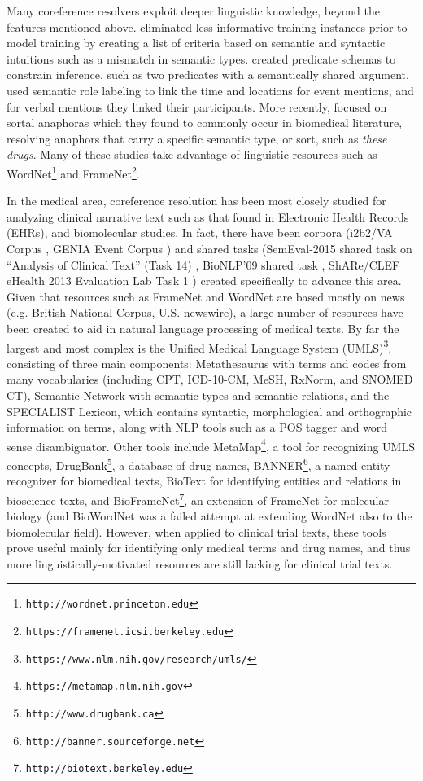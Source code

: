 Many coreference resolvers exploit deeper linguistic knowledge, beyond the features mentioned above.  eliminated less-informative training instances prior to model training by creating a list of criteria based on semantic and syntactic intuitions such as a mismatch in semantic types.  created predicate schemas to constrain inference, such as two predicates with a semantically shared argument.  used semantic role labeling to link the time and locations for event mentions, and for verbal mentions they linked their participants. More recently,  focused on sortal anaphoras which they found to commonly occur in biomedical literature, resolving anaphors that carry a specific semantic type, or sort, such as \textit{these drugs}.  Many of these studies take advantage of linguistic resources such as WordNet\footnote{\tt http://wordnet.princeton.edu} and FrameNet\footnote{\tt https://framenet.icsi.berkeley.edu}.

In the medical area, coreference resolution has been most closely studied for analyzing clinical narrative text such as that found in Electronic Health Records (EHRs), and biomolecular studies. In fact, there have been corpora (i2b2/VA Corpus \cite{Uzuner:2012}, GENIA Event Corpus \cite{Kim:2008}) and shared tasks (SemEval-2015 shared task on “Analysis of Clinical Text” (Task 14) \cite{Elhadad:2015}, BioNLP’09 shared task \cite{Kim:2009}, ShARe/CLEF eHealth 2013 Evaluation Lab Task 1 \cite{Pradhan:2013}) created specifically to advance this area. Given that resources such as FrameNet and WordNet are based mostly on news (e.g. British National Corpus, U.S. newswire), a large number of resources have been created to aid in natural language processing of medical texts. By far the largest and most complex is the Unified Medical Language System (UMLS)\footnote{\tt https://www.nlm.nih.gov/research/umls/}, consisting of three main components:  Metathesaurus with terms and codes from many vocabularies (including CPT, ICD-10-CM, MeSH, RxNorm, and SNOMED CT), Semantic Network with semantic types and semantic relations, and the SPECIALIST Lexicon, which contains syntactic, morphological and orthographic information on terms, along with NLP tools such as a POS tagger and word sense disambiguator. Other tools include MetaMap\footnote{\tt https://metamap.nlm.nih.gov}, a tool for recognizing UMLS concepts, DrugBank\footnote{\tt http://www.drugbank.ca}, a database of drug names, BANNER\footnote{\tt http://banner.sourceforge.net}, a named entity recognizer for biomedical texts, BioText for identifying entities and relations in bioscience texts, and BioFrameNet\footnote{\tt http://biotext.berkeley.edu}, an extension of FrameNet for molecular biology (and BioWordNet \cite{Poprat:2008} was a failed attempt at extending WordNet also to the biomolecular field). However, when applied to clinical trial texts, these tools prove useful mainly for identifying only medical terms and drug names, and thus more linguistically-motivated resources are still lacking for clinical trial texts.

